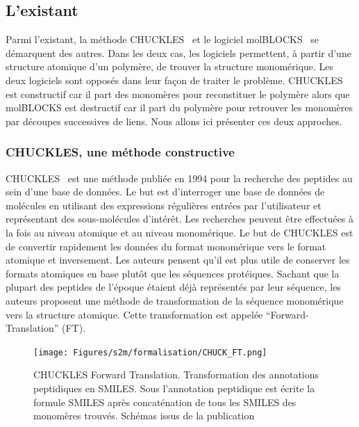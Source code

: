 \subsection{L'existant}

Parmi l'existant, la méthode CHUCKLES~\cite{siani_chuckles:_1994} et le logiciel molBLOCKS~\cite{ghersi_molblocks:_2014} se démarquent des autres.
Dans les deux cas, les logiciels permettent, à partir d'une structure atomique d'un polymère, de trouver la structure monomérique.
Les deux logiciels sont opposés dans leur façon de traiter le problème.
CHUCKLES est constructif car il part des monomères pour reconstituer le polymère alors que molBLOCKS est destructif car il part du polymère pour retrouver les monomères par découpes successives de liens.
Nous allons ici présenter ces deux approches.


\subsubsection{CHUCKLES, une méthode constructive}

CHUCKLES~\cite{siani_chuckles:_1994} est une méthode publiée en 1994 pour la recherche des peptides au sein d'une base de données.
Le but est d'interroger une base de données de molécules en utilisant des expressions régulières entrées par l'utilisateur et représentant des sous-molécules d'intérêt.
Les recherches peuvent être effectuées à la fois au niveau atomique et au niveau monomérique.
Le but de CHUCKLES est de convertir rapidement les données du format monomérique vers le format atomique et inversement.
Les auteurs pensent qu'il est plus utile de conserver les formats atomiques en base plutôt que les séquences protéiques.
Sachant que la plupart des peptides de l'époque étaient déjà représentés par leur séquence, les auteurs proposent une méthode de transformation de la séquence monomérique vers la structure atomique.
Cette transformation est appelée ``Forward-Translation'' (FT).

\begin{figure}[!ht]
  \begin{center}
    \texttt{[image: Figures/s2m/formalisation/CHUCK\_FT.png]}
    \caption{\label{chuck_ft}CHUCKLES Forward Translation.
    Transformation des annotations peptidiques en SMILES.
    Sous l'annotation peptidique est écrite la formule SMILES après concaténation de tous les SMILES des monomères trouvés.
    Schémas issus de la publication}
  \end{center}
\end{figure}

